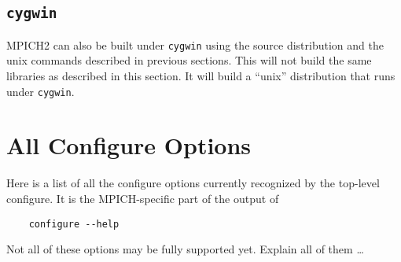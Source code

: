 \documentclass[dvipdfm,11pt]{article}
\begin{document}
\subsection{\texttt{cygwin}}
\label{sec:cygwin}

MPICH2 can also be built under \texttt{cygwin} using the source
distribution and the unix commands described in previous sections.  This
will not build the same libraries as described in this section.  It will 
build a ``unix'' distribution that runs under \texttt{cygwin}.

\section{All Configure Options}
\label{configure-options}
Here is a list of all the configure options currently recognized by the
top-level configure.  It is the MPICH-specific part of the output of 
\begin{verbatim}
    configure --help
\end{verbatim}
Not all of these options may be fully supported yet.  Explain all of
them \ldots{}
\end{document}
